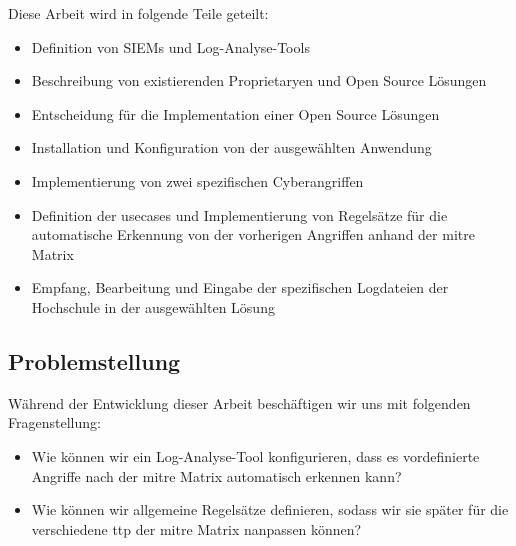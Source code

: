 Diese Arbeit wird in folgende Teile geteilt: 





{
\begin{itemize}[noitemsep]
   \item	Definition von SIEMs und Log-Analyse-Tools 
   \item	Beschreibung von existierenden \gls{Proprietary}en und Open Source Lösungen
   \item	Entscheidung für die Implementation einer Open Source Lösungen 
   \item	Installation und Konfiguration von der ausgewählten Anwendung 
   \item	Implementierung von zwei spezifischen Cyberangriffen 
   \item	Definition der \gls{usecases} und Implementierung von Regelsätze für die automatische Erkennung von der vorherigen Angriffen anhand der \gls{mitre} Matrix 
   \item	Empfang, Bearbeitung und Eingabe der spezifischen Logdateien der Hochschule in der ausgewählten Lösung
\end{itemize}
}

\subsection{Problemstellung}
Während der Entwicklung dieser Arbeit beschäftigen wir uns mit folgenden Fragenstellung: 

{
\begin{itemize}[noitemsep]
   \item Wie können wir ein Log-Analyse-Tool konfigurieren, dass es vordefinierte Angriffe nach der \gls{mitre} Matrix automatisch erkennen kann? 
   \item Wie können wir allgemeine Regelsätze definieren, sodass wir sie später für die verschiedene \gls{ttp} der \gls{mitre} Matrix nanpassen können?
\end{itemize}
}

